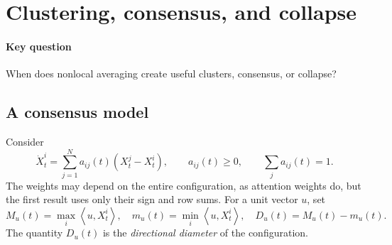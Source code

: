 \documentclass[11pt]{amsart}
\numberwithin{equation}{section}
\theoremstyle{plain}
\newcommand{\ip}[2]{\left\langle#1,#2\right\rangle}
\begin{document}
\section{Clustering, consensus, and collapse}
\label{sec:clustering}
\paragraph{\textbf{Key question}}
When does nonlocal averaging create useful clusters, consensus, or collapse?

\subsection{A consensus model}
Consider
\begin{equation}\label{eq:consensus}
    \dot X_t^i=\sum_{j=1}^Na_{ij}(t)(X_t^j-X_t^i),
    \qquad a_{ij}(t)\geq0,\qquad\sum_ja_{ij}(t)=1.
\end{equation}
The weights may depend on the entire configuration, as attention weights do,
but the first result uses only their sign and row sums.  For a unit vector $u$,
set
\begin{equation}\label{eq:directional-diameter}
 M_u(t)=\max_i\ip{u}{X_t^i},\quad
 m_u(t)=\min_i\ip{u}{X_t^i},\quad
 D_u(t)=M_u(t)-m_u(t).
\end{equation}
The quantity $D_u(t)$ is the \emph{directional diameter} of the configuration.
\end{document}
